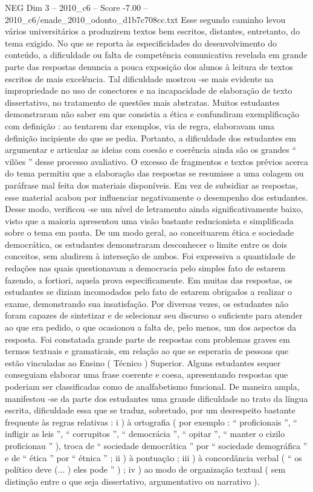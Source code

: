 \begin{textsample}{NEG Dim 3 – 2010\_c6 – Score -7.00 – 2010\_c6/enade\_2010\_odonto\_d1b7c708cc.txt}
Esse segundo caminho levou vários universitários a produzirem textos bem escritos, distantes, entretanto, do tema exigido.
No que se reporta às especificidades do desenvolvimento do conteúdo, a dificuldade ou falta de competência comunicativa revelada em grande parte das respostas denuncia a pouca exposição dos alunos à leitura de textos escritos de mais excelência.
Tal dificuldade mostrou -se mais evidente na impropriedade no uso de conectores e na incapacidade de elaboração de texto dissertativo, no tratamento de questões mais abstratas.
Muitos estudantes demonstraram não saber em que consistia a ética e confundiram exemplificação com definição : ao tentarem dar exemplos, via de regra, elaboravam uma definição incipiente do que se pedia.
Portanto, a dificuldade dos estudantes em argumentar e articular as ideias com coesão e coerência ainda são os grandes “ vilões ” desse processo avaliativo.
O excesso de fragmentos e textos prévios acerca do tema permitiu que a elaboração das respostas se resumisse a uma colagem ou paráfrase mal feita dos materiais disponíveis.
Em vez de subsidiar as respostas, esse material acabou por influenciar negativamente o desempenho dos estudantes.
Desse modo, verificou -se um nível de letramento ainda significativamente baixo, visto que a maioria apresentou uma visão bastante reducionista e simplificada sobre o tema em pauta.
De um modo geral, ao conceituarem ética e sociedade democrática, os estudantes demonstraram desconhecer o limite entre os dois conceitos, sem aludirem à interseção de ambos.
Foi expressiva a quantidade de redações nas quais questionavam a democracia pelo simples fato de estarem fazendo, a fortiori, aquela prova especificamente.
Em muitas das respostas, os estudantes se diziam incomodados pelo fato de estarem obrigados a realizar o exame, demonstrando sua insatisfação.
Por diversas vezes, os estudantes não foram capazes de sintetizar e de selecionar seu discurso o suficiente para atender ao que era pedido, o que ocasionou a falta de, pelo menos, um dos aspectos da resposta.
Foi constatada grande parte de respostas com problemas graves em termos textuais e gramaticais, em relação ao que se esperaria de pessoas que estão vinculadas ao Ensino ( Técnico ) Superior.
Alguns estudantes sequer conseguiam elaborar uma frase coerente e coesa, apresentando respostas que poderiam ser classificadas como de analfabetismo funcional.
De maneira ampla, manifestou -se da parte dos estudantes uma grande dificuldade no trato da língua escrita, dificuldade essa que se traduz, sobretudo, por um desrespeito bastante frequente às regras relativas : i ) à ortografia ( por exemplo : “ proficionais ”, “ infligir as leis ”, “ corrupitos ”, “ democrácia ”, “ opitar ”, “ manter o cizilo proficionau ” ), troca de “ sociedade democrática ” por “ sociedade demográfica ” e de “ ética ” por “ étnica ” ; ii ) à pontuação ; iii ) à concordância verbal ( “ os político deve (... ) eles pode ” ) ; iv ) ao modo de organização textual ( sem distinção entre o que seja dissertativo, argumentativo ou narrativo ).

\end{textsample}
